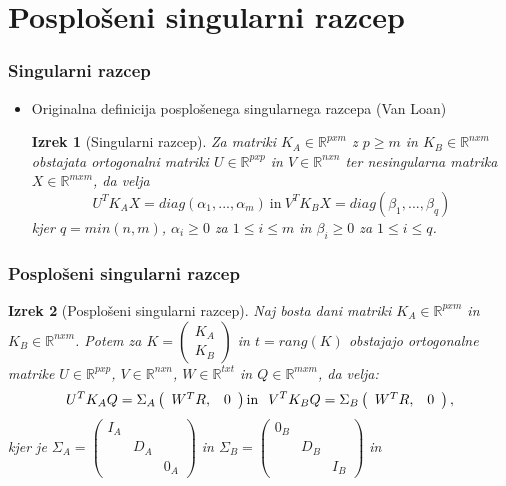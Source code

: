 \documentclass{beamer}
\newtheorem{izrek}{Izrek}
\begin{document}
\section{Posplošeni singularni razcep}

\begin{frame}
\frametitle{Singularni razcep}
\begin{itemize}
\item Originalna definicija posplošenega singularnega razcepa (Van Loan)
\begin{izrek}[Singularni razcep]
\label{izrek:SVD} Za matriki $K_A \in \mathbb{R}^{pxm}$ z $p \geq m$ in $K_B \in \mathbb{R}^{nxm}$ obstajata ortogonalni matriki $U \in \mathbb{R}^{pxp}$ in $V \in \mathbb{R}^{nxn}$ ter nesingularna matrika $X \in \mathbb{R}^{mxm}$, da velja $$ U^T K_A X = diag(\alpha_1,..., \alpha_m) \ \text{in} \ V^T K_B X = diag(\beta_1,..., \beta_q) $$ kjer $q = min(n,m)$, $\alpha_i \geq 0$ za $1 \leq i \leq m$ in  $\beta_i \geq 0$ za  $1 \leq i \leq q$.
\end{izrek}
\end{itemize}
\end{frame}

\begin{frame}
\frametitle{Posplošeni singularni razcep}
\begin{izrek}[Posplošeni singularni razcep]
\label{izrek:GSVD} Naj bosta dani matriki $K_A \in \mathbb{R}^{pxm}$ in $K_B \in \mathbb{R}^{nxm}$. Potem za $K = \left(\begin{array}{c} K_A \\ K_B \end{array}\right)$ in $t = rang(K)$ obstajajo ortogonalne matrike $U \in \mathbb{R}^{pxp}$, $V \in \mathbb{R}^{nxn}$, $W \in \mathbb{R}^{txt}$ in $Q \in \mathbb{R}^{mxm}$, da velja: 
$$U^T K_A Q = \Sigma_A  \left(\begin{array}{cc} W^T R, & 0 \end{array}\right) \text{in}\hspace{2.5mm} V^T K_B Q = \Sigma_B  \left(\begin{array}{cc} W^T R, & 0 \end{array}\right),$$ kjer je 
$\Sigma_A = \begin{pmatrix} 
I_A &  & \\
 & D_A & \\
 & & 0_A  
\end{pmatrix}$ in
$\Sigma_B = \begin{pmatrix} 
0_B &  & \\
 & D_B & \\
 & & I_B  
\end{pmatrix}$ in
\end{izrek}
\end{frame}
\end{document}
